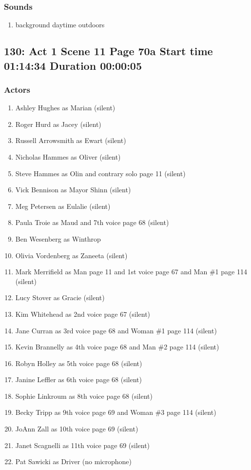\subsubsection{Sounds}
\begin{enumerate}
\item background daytime outdoors
\end{enumerate}
\subsection{130: Act 1 Scene 11 Page 70a Start time 01:14:34 Duration 00:00:05}

\subsubsection{Actors}
\begin{enumerate}
\item Ashley Hughes as Marian (silent)
\item Roger Hurd as Jacey (silent)
\item Russell Arrowsmith as Ewart (silent)
\item Nicholas Hammes as Oliver (silent)
\item Steve Hammes as Olin and contrary solo page 11 (silent)
\item Vick Bennison as Mayor Shinn (silent)
\item Meg Petersen as Eulalie (silent)
\item Paula Troie as Maud and 7th voice page 68 (silent)
\item Ben Wesenberg as Winthrop
\item Olivia Vordenberg as Zaneeta (silent)
\item Mark Merrifield as Man page 11 and 1st voice page 67 and Man \#1 page 114 (silent)
\item Lucy Stover as Gracie (silent)
\item Kim Whitehead as 2nd voice page 67 (silent)
\item Jane Curran as 3rd voice page 68 and Woman \#1 page 114 (silent)
\item Kevin Brannelly as 4th voice page 68 and Man \#2 page 114 (silent)
\item Robyn Holley as 5th voice page 68 (silent)
\item Janine Leffler as 6th voice page 68 (silent)
\item Sophie Linkroum as 8th voice page 68 (silent)
\item Becky Tripp as 9th voice page 69 and Woman \#3 page 114 (silent)
\item JoAnn Zall as 10th voice page 69 (silent)
\item Janet Scagnelli as 11th voice page 69 (silent)
\item Pat Sawicki as Driver (no microphone)
\end{enumerate}

